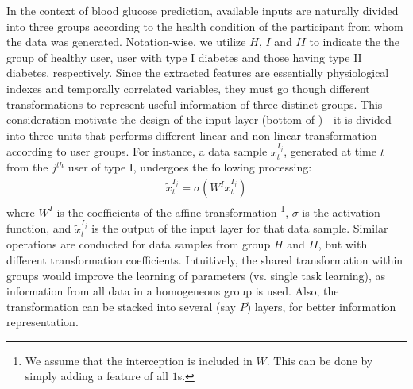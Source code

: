 In the context of blood glucose prediction, available inputs are naturally divided into three groups according to the health condition of the participant from whom the data was generated.
Notation-wise, we utilize $H$, $I$ and $II$ to indicate the the group of healthy user, user with type I diabetes and those having type II diabetes, respectively.
Since the extracted features are essentially physiological indexes and temporally correlated variables, they must go though different transformations to represent useful information of three distinct groups.
This consideration motivate the design of the input layer (bottom of ) - it is divided into three units that performs different linear and non-linear transformation according to user groups.
For instance, a data sample $x_t^{I_j}$, generated at time $t$ from the $j^{th}$ user of type I, undergoes the following processing:
\begin{align}
\tilde{x}_t^{I_j} = \sigma \left( W^Ix_t^{I_j} \right)
\end{align}
where $W^I$ is the coefficients of the affine transformation \footnote{We assume that the interception is included in $W$. This can be done by simply adding a feature of all $1$s.}, $\sigma$ is the activation function, and $\tilde{x}_t^{I_j}$ is the output of the input layer for that data sample.
Similar operations are conducted for data samples from group $H$ and $II$, but with different transformation coefficients.
Intuitively, the shared transformation within groups would improve the learning of parameters (vs. single task learning), as information from all data in a homogeneous group is used.
Also, the transformation can be stacked into several (say $P$) layers, for better information representation.

